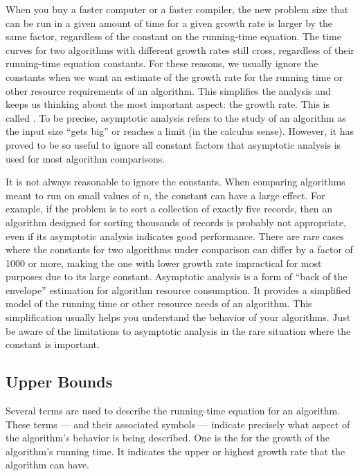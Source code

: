 When you buy a faster computer or a faster compiler,
the new problem size that can be run in a given amount of time for a
given growth rate is
larger by the same factor, regardless of the constant on the
running-time equation.
The time curves for two algorithms with different growth rates
still cross, regardless of their running-time equation constants.
For these reasons, we usually ignore the constants when we want an
estimate of the growth rate for the running time or other resource
requirements of an algorithm.
This simplifies the analysis and keeps us thinking about the most
important aspect: the growth rate.
This is called .
To be precise, asymptotic analysis refers to the study of an
algorithm as the input size ``gets big'' or reaches
a limit (in the calculus sense).
However, it has proved to be so useful to ignore all constant factors
that asymptotic analysis is used for most algorithm comparisons.

It is not always reasonable to ignore the constants.
When comparing algorithms meant to run on small values of \(n\),
the constant can have a large effect.
For example, if the problem is to sort a collection of exactly
five records, then an algorithm designed for sorting thousands of
records is probably not appropriate, even if its asymptotic analysis
indicates good performance.
There are rare cases where the constants for two algorithms under
comparison can differ by a factor of 1000 or more, making the one
with lower growth rate impractical for most purposes due to its large
constant.
Asymptotic analysis is a form of ``back of the envelope''
estimation for algorithm resource consumption.
It provides a simplified model of the running time or
other resource needs of an algorithm.
This simplification usually helps you understand the behavior of your
algorithms.
Just be aware of the limitations to asymptotic analysis in the
rare situation where the constant is important.

\subsection{Upper Bounds}

Several terms are used to describe the running-time equation for an
algorithm.
These terms --- and their associated symbols --- indicate precisely what
aspect of the algorithm's behavior is being described.
One is the  for the growth of the algorithm's
running time.
It indicates the upper or highest growth rate that
the algorithm can have.

